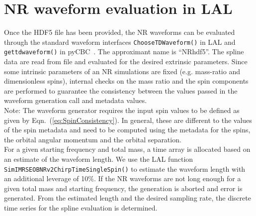 \documentclass[11pt,tightenlines,article,amssymb,amsmath,amsfonts,superscriptaddress]{revtex4}
\begin{document}
\section{NR waveform evaluation in LAL}
\label{sec:gen}
Once the HDF5 file has been provided, the NR waveforms can be evaluated through the standard waveform interfaces \texttt{ChooseTDWaveform()} in LAL and \texttt{get\textunderscore td\textunderscore waveform()} in pyCBC~\cite{Canton:2014ena}. The approximant name is ``NR\textunderscore hdf5''. 
The spline data are read from file and evaluated for the desired extrinsic parameters. Since some intrinsic parameters of an NR simulations are fixed (e.g. mass-ratio and dimensionless spins), internal checks on the mass ratio and the spin components are performed to guarantee the consistency between the values passed in the waveform generation call and metadata values. \\
Note: The waveform generator requires the input spin values to be defined as given by Eqn.~(\ref{eq:SpinConsistency}). In general, these are different to the values of the spin metadata and need to be computed using the metadata for the spins, the orbital angular momentum and the orbital separation. 
\\For a given starting frequency and total mass, a time array is allocated based on an estimate of the waveform length. We use the LAL function 
\texttt{SimIMRSEOBNRv2ChirpTimeSingleSpin()} to estimate the waveform length with an additional leverage of 10\%. If the NR waveforms are not long enough for a given total mass and starting frequency, the generation is aborted and error is generated. From the estimated length and the desired sampling rate, the discrete time series for the spline evaluation is determined.\\
\end{document}
